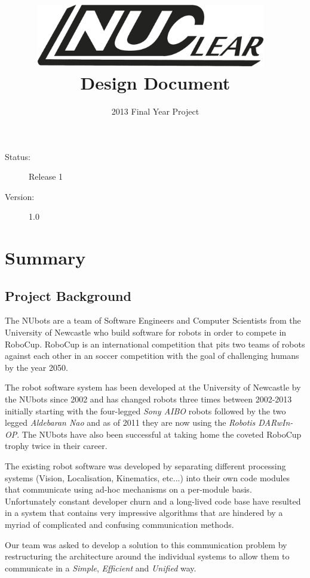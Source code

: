 \documentclass[english,12pt]{scrartcl}
\title{\includegraphics[width=0.75\textwidth]{./Logo/NUClear-logo}~\\[1cm] Design Document}
\author{2013 Final Year Project}
\begin{document}
	\maketitle

	\vfill
	{\large
		\begin{description}
			\item [Status:] Release 1
			\item [Version:] 1.0
		\end{description}}

	\clearpage
	\tableofcontents
	\clearpage
		
	\section{Summary}
		\subsection{Project Background}
			The NUbots are a team of Software Engineers and Computer Scientists from the University of Newcastle who build software for robots in order to compete in RoboCup.
			RoboCup is an international competition that pits two teams of robots against each other in an soccer competition with the goal of challenging humans by the year 2050.
			
			The robot software system has been developed at the University of Newcastle by the NUbots since 2002 and has changed robots three times between 2002-2013 initially starting with the four-legged \emph{Sony AIBO} robots followed by the two legged \emph{Aldebaran Nao} and as of 2011 they are now using the \emph{Robotis DARwIn-OP}.
			The NUbots have also been successful at taking home the coveted RoboCup trophy twice in their career.
			
			The existing robot software was developed by separating different processing systems (Vision, Localisation, Kinematics, etc...) into their own code modules that communicate using ad-hoc mechanisms on a per-module basis. 
			Unfortunately constant developer churn and a long-lived code base have resulted in a system that contains very impressive algorithms that are hindered by a myriad of complicated and confusing communication methods.
			
			Our team was asked to develop a solution to this communication problem by restructuring the architecture around the individual systems to allow them to communicate in a \emph{Simple}, \emph{Efficient} and \emph{Unified} way. 
			
\end{document}
